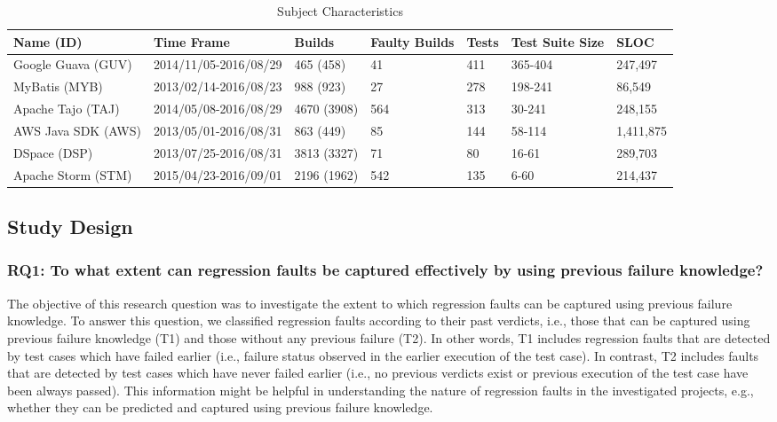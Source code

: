 \documentclass[1p]{elsarticle}
\begin{document}
\begin{table}[H]
\centering
\caption {Subject Characteristics}
\label{table:subj_char}
\begin{tabular}{|p{3.5cm}|p{2cm}|p{1cm}|p{1cm}|p{0.75cm}|p{1.5cm}|p{1.25cm}|}
\hline                       
  Name (ID) &  Time Frame & Builds & Faulty Builds & Tests & Test Suite Size & SLOC\\
\hline  
\hline 
Google Guava (GUV) & 2014/11/05-2016/08/29 & 465 (458) & 41 & 411 & 365-404 & 247,497\\
\hline 
MyBatis (MYB) & 2013/02/14-2016/08/23 & 988 (923) & 27 & 278 & 198-241 & 86,549\\
\hline  
Apache Tajo (TAJ) & 2014/05/08-2016/08/29 & 4670 (3908) & 564 & 313 & 30-241 & 248,155\\
\hline    
AWS Java SDK (AWS) & 2013/05/01-2016/08/31 & 863 (449) & 85 & 144 & 58-114 & 1,411,875\\
\hline   
DSpace (DSP) & 2013/07/25-2016/08/31 & 3813 (3327) & 71 & 80 & 16-61 & 289,703\\
\hline   
Apache Storm (STM) & 2015/04/23-2016/09/01 & 2196 (1962) & 542 & 135 & 6-60 & 214,437\\
\hline   
\end{tabular}
\end{table}

\subsection{Study Design}
\label{section_studydesign}

\subsubsection{RQ1: To what extent can regression faults be captured effectively by using previous failure knowledge?}

The objective of this research question was to investigate the extent to which regression faults can be captured using previous failure knowledge. To answer this question, we classified regression faults according to their past verdicts, i.e., those that can be captured using previous failure knowledge (T1) and those without any previous failure (T2). In other words, T1 includes regression faults that are detected by test cases which have failed earlier (i.e., failure status observed in the earlier execution of the test case). In contrast, T2 includes faults that are detected by test cases which have never failed earlier (i.e., no previous verdicts exist or previous execution of the test case have been always passed). This information might be helpful in understanding the nature of regression faults in the investigated projects, e.g., whether they can be predicted and captured using previous failure knowledge. 
\end{document}
